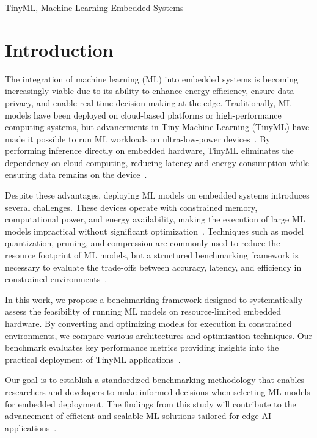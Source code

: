 \documentclass[conference]{IEEEtran}
\begin{document}
\begin{IEEEkeywords}
TinyML, Machine Learning Embedded Systems
\end{IEEEkeywords}

\section{Introduction}
The integration of machine learning (ML) into embedded systems is becoming increasingly viable due to its ability to enhance energy efficiency, ensure data privacy, and enable real-time decision-making at the edge. Traditionally, ML models have been deployed on cloud-based platforms or high-performance computing systems, but advancements in Tiny Machine Learning (TinyML) have made it possible to run ML workloads on ultra-low-power devices~\cite{tinyml2021, david2020tensorflow}. By performing inference directly on embedded hardware, TinyML eliminates the dependency on cloud computing, reducing latency and energy consumption while ensuring data remains on the device~\cite{banbury2021micronets, bouguera2018energy}.  

Despite these advantages, deploying ML models on embedded systems introduces several challenges. These devices operate with constrained memory, computational power, and energy availability, making the execution of large ML models impractical without significant optimization~\cite{federov2019sparse}. Techniques such as model quantization, pruning, and compression are commonly used to reduce the resource footprint of ML models, but a structured benchmarking framework is necessary to evaluate the trade-offs between accuracy, latency, and efficiency in constrained environments~\cite{koizumi2019toyadmos, he2016deep}.  

In this work, we propose a benchmarking framework designed to systematically assess the feasibility of running ML models on resource-limited embedded hardware. By converting and optimizing models for execution in constrained environments, we compare various architectures and optimization techniques. Our benchmark evaluates key performance metrics providing insights into the practical deployment of TinyML applications~\cite{warden2018speech, zhang2017hello}.  

Our goal is to establish a standardized benchmarking methodology that enables researchers and developers to make informed decisions when selecting ML models for embedded deployment. The findings from this study will contribute to the advancement of efficient and scalable ML solutions tailored for edge AI applications~\cite{purohit2019mimii, torralba2008tiny}.
\end{document}

